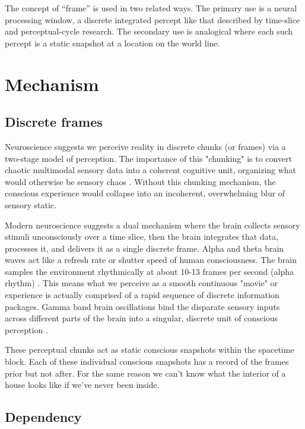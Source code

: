\documentclass[11pt,a4paper]{article}
\begin{document}
The concept of “frame” is used in two related ways. The primary use is a neural processing window, a discrete integrated percept like that described by time-slice and perceptual-cycle research. The secondary use is analogical where each such percept is a static snapshot at a location on the world line.

\section{Mechanism}

\subsection{Discrete frames}

Neuroscience suggests we perceive reality in discrete chunks (or frames) via a two-stage model of perception. The importance of this "chunking" is to convert chaotic multimodal sensory data into a coherent cognitive unit, organizing what would otherwise be sensory chaos \citep{herzog2016}. Without this chunking mechanism, the conscious experience would collapse into an incoherent, overwhelming blur of sensory static.

Modern neuroscience suggests a dual mechanism where the brain collects sensory stimuli unconsciously over a time slice, then the brain integrates that data, processes it, and delivers it as a single discrete frame. Alpha and theta brain waves act like a refresh rate or shutter speed of human consciousness. The brain samples the environment rhythmically at about 10-13 frames per second (alpha rhythm) \citep{vanrullen2016}. This means what we perceive as a smooth continuous "movie" or experience is actually comprised of a rapid sequence of discrete information packages. Gamma band brain oscillations bind the disparate sensory inputs across different parts of the brain into a singular, discrete unit of conscious perception \citep{doesburg2009}.

These perceptual chunks act as static conscious snapshots within the spacetime block. Each of these individual conscious snapshots has a record of the frames prior but not after. For the same reason we can’t know what the interior of a house looks like if we’ve never been inside.

\subsection{Dependency}
\end{document}
